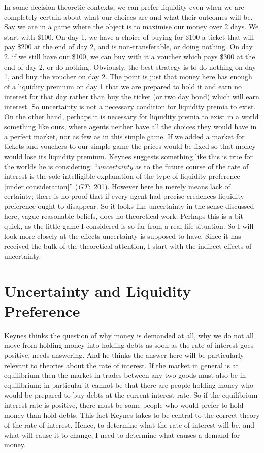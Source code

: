 \documentclass[
  11pt,
  letterpaper,
  DIV=11,
  numbers=noendperiod,
  twoside]{scrartcl}
\begin{document}
In some decision-theoretic contexts, we can prefer liquidity even when
we are completely certain about what our choices are and what their
outcomes will be. Say we are in a game where the object is to maximise
our money over 2 days. We start with \$100. On day 1, we have a choice
of buying for \$100 a ticket that will pay \$200 at the end of day 2,
and is non-transferable, or doing nothing. On day 2, if we still have
our \$100, we can buy with it a voucher which pays \$300 at the end of
day 2, or do nothing. Obviously, the best strategy is to do nothing on
day 1, and buy the voucher on day 2. The point is just that money here
has enough of a liquidity premium on day 1 that we are prepared to hold
it and earn no interest for that day rather than buy the ticket (or two
day bond) which will earn interest. So uncertainty is not a necessary
condition for liquidity premia to exist. On the other hand, perhaps it
is necessary for liquidity premia to exist in a world something like
ours, where agents neither have all the choices they would have in a
perfect market, nor as few as in this simple game. If we added a market
for tickets and vouchers to our simple game the prices would be fixed so
that money would lose its liquidity premium. Keynes suggests something
like this is true for the worlds he is considering: ``\emph{uncertainty}
as to the future course of the rate of interest is the sole intelligible
explanation of the type of liquidity preference {[}under
consideration{]}'' (\emph{GT}:~201). However here he merely means lack
of certainty; there is no proof that if every agent had precise
credences liquidity preference ought to disappear. So it looks like
uncertainty in the sense discussed here, vague reasonable beliefs, does
no theoretical work. Perhaps this is a bit quick, as the little game I
considered is so far from a real-life situation. So I will look more
closely at the effects uncertainty is supposed to have. Since it has
received the bulk of the theoretical attention, I start with the
indirect effects of uncertainty.

\section{Uncertainty and Liquidity
Preference}\label{uncertainty-and-liquidity-preference}

Keynes thinks the question of why money is demanded at all, why we do
not all move from holding money into holding debts as soon as the rate
of interest goes positive, needs answering. And he thinks the answer
here will be particularly relevant to theories about the rate of
interest. If the market in general is at equilibrium then the market in
trades between any two goods must also be in equilibrium; in particular
it cannot be that there are people holding money who would be prepared
to buy debts at the current interest rate. So if the equilibrium
interest rate is positive, there must be some people who would prefer to
hold money than hold debts. This fact Keynes takes to be central to the
correct theory of the rate of interest. Hence, to determine what the
rate of interest will be, and what will cause it to change, I need to
determine what causes a demand for money.
\end{document}
